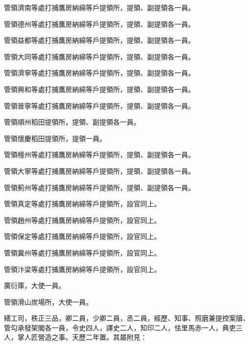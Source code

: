 \begin{pinyinscope}
 管領濟南等處打捕鷹房納綿等戶提領所，提領、副提領各一員。



 管領德州等處打捕鷹房納綿等戶提領所，提領、副提領各一員。



 管領益都等處打捕鷹房納綿等戶提領所，提領、副提領各一員。



 管領大同等處打捕鷹房納綿等戶提領所，提領、副提領各一員。



 管領濟寧等處打捕鷹房納綿等戶提領所，提領、副提領各一員。



 管領興和等處打捕鷹房納綿等戶提領所，提領、副提領各一員。



 管領晉寧等處打捕鷹房納綿等戶提領所，提領、副提領各一員。



 管領順州稻田提領所，提領、副提領各一員。



 管領懷慶稻田提領所，提領一員。



 管領檀州等處打捕鷹房納綿等戶提領所，提領、副提領各一員。



 管領大寧等處打捕鷹房納綿等戶提領所，提領、副提領各一員。



 管領薊州等處打捕鷹房納綿等戶提領所，提領、副提領各一員。



 管領真定等處打捕鷹房納綿等戶提領所，設官同上。



 管領趙州等處打捕鷹房納綿等戶提領所，設官同上。



 管領保定等處打捕鷹房納綿等戶提領所，設官同上。



 管領冀州等處打捕鷹房納綿等戶提領所，設官同上。



 管領汴梁等處打捕鷹房納綿等戶提領所，設官同上。



 廣衍庫，大使一員。



 管領滑山炭場所，大使一員。



 繕工司，秩正三品，卿二員，少卿二員，丞二員，經歷、知事、照磨兼提控案牘、管勾承發架閣各一員，令史四人，譯史二人，知印二人，怯里馬赤一人，典吏三人，掌人匠營造之事。天歷二年置。其屬附見：




\end{pinyinscope}
